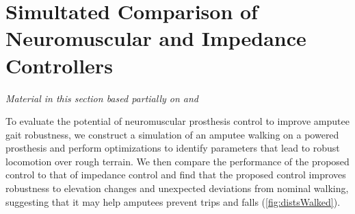 \chapter{Simultated Comparison of Neuromuscular and Impedance
Controllers}\label{sec:control_sim}

\graphicspath{{chapters/control_simulation/figures/}}

\emph{Material in this section based partially on
\citet{thatte2016toward}\cite{thatte2016toward} and
\citet{thatte2014towards}\cite[0.25in]{thatte2014towards}} \linebreak

To evaluate the potential of neuromuscular prosthesis control to improve amputee
gait robustness, we construct a simulation of an amputee walking on a powered
prosthesis and perform optimizations to identify parameters that lead to robust
locomotion over rough terrain. We then compare the performance of the proposed
control to that of impedance control and find that the proposed control improves
robustness to elevation changes and unexpected deviations from nominal walking,
suggesting that it may help amputees prevent trips and falls
(\cref{fig:distsWalked}).




